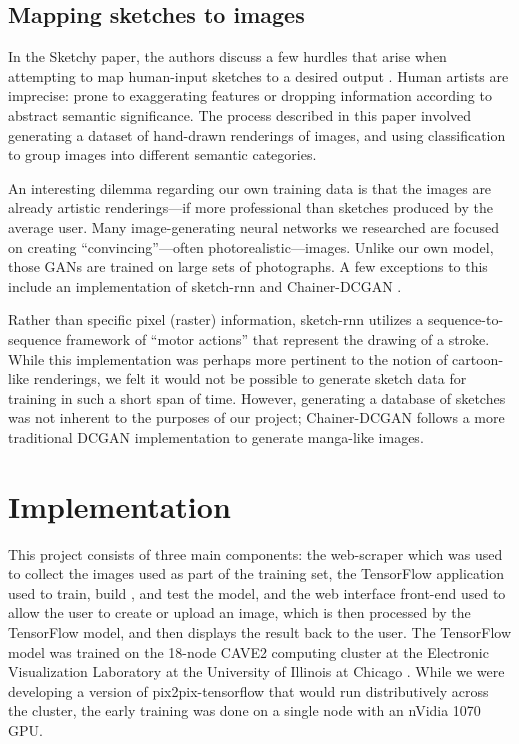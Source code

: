\documentclass[sigchi]{acmart}
\begin{document}
\subsection{Mapping sketches to images}

In the Sketchy paper, the authors discuss a few hurdles that arise when attempting to map human-input sketches to a desired output \cite{sketchy}. Human artists are imprecise: prone to exaggerating features or dropping information according to abstract semantic significance. The process described in this paper involved generating a dataset of hand-drawn renderings of images, and using classification to group images into different semantic categories.

An interesting dilemma regarding our own training data is that the images are already artistic renderings—if more professional than sketches produced by the average user. Many image-generating neural networks we researched are focused on creating “convincing”—often photorealistic—images. Unlike our own model, those GANs are trained on large sets of photographs. A few exceptions to this include an implementation of sketch-rnn \cite{2017arXiv170403477H} and Chainer-DCGAN \cite{chainer-DCGAN}.

Rather than specific pixel (raster) information, sketch-rnn utilizes a sequence-to-sequence framework of “motor actions” that represent the drawing of a stroke. While this implementation was perhaps more pertinent to the notion of cartoon-like renderings, we felt it would not be possible to generate sketch data for training in such a short span of time. However, generating a database of sketches was not inherent to the purposes of our project; Chainer-DCGAN follows a more traditional DCGAN implementation to generate manga-like images.

\section{Implementation}
This project consists of three main components: the web-scraper which was used to collect the images used as part of the training set, the TensorFlow application used to train, build , and test the model, and the web interface front-end used to allow the user to create or upload an image, which is then processed by the TensorFlow model, and then displays the result back to the user. The TensorFlow model was trained on the 18-node CAVE2 computing cluster at the Electronic Visualization Laboratory at the University of Illinois at Chicago \cite{CAVE2_2013}. While we were developing a version of pix2pix-tensorflow that would run distributively across the cluster, the early training was done on a single node with an nVidia 1070 GPU.
\end{document}
